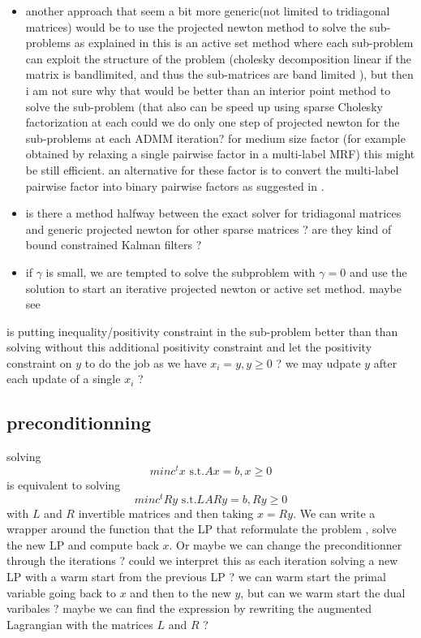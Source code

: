 \documentclass[11pt]{article}
\begin{document}
\begin{itemize}
\item 
another approach that seem a bit more generic(not limited to tridiagonal matrices) would be to use the projected newton method to solve the sub-problems
 as explained in \cite{Tom2013}
 this is an active set method where each sub-problem can exploit the structure of the problem (cholesky decomposition linear if the matrix is bandlimited, and thus the sub-matrices are band limited ), but then i am not  sure why that would be better than an interior point method to solve the sub-problem (that also can be speed up using sparse Cholesky factorization at each  could we do only one step of projected newton for the sub-problems at each ADMM iteration? 
 for medium size factor (for example obtained by relaxing a single pairwise factor in a multi-label MRF) this might be still efficient. an alternative for these factor is to convert the multi-label pairwise factor into binary pairwise factors as suggested in \cite{Smith2011}.
 
 
\item is there a method halfway between the exact solver for tridiagonal matrices and generic  projected newton for other sparse matrices ? are they kind of bound constrained Kalman filters ?  

\item if $\gamma$ is small, we are tempted to solve the subproblem with $\gamma=0$ and use the solution to start an iterative projected newton or active set method.
  maybe see \cite{Gupta2007}
 \end{itemize}
 
 is putting inequality/positivity constraint in the sub-problem  better than than solving without this additional positivity constraint and let the positivity constraint on $y$ to do the job as we have $x_i=y, y\geq 0$ ?  we may udpate $y$ after each update of a single $x_i$ ? 
 
\subsection{preconditionning}
solving
\begin{equation}
min c^t x \text{ s.t.} Ax= b,x \geq 0 
\end{equation}
is equivalent to solving
\begin{equation}
min c^t Ry \text{ s.t.} LARy= b,Ry \geq 0 
\end{equation}
with $L$ and $R$ invertible matrices and then
taking $x=Ry$.
We can write a wrapper around the function that the LP that reformulate the problem , solve the new LP and compute back $x$.
Or maybe we can change the preconditionner through the  iterations ? could we interpret this as each iteration solving a new LP with a warm start from the previous LP ? 
we can warm start the primal variable going back to $x$ and then to the new $y$, but can we warm start the dual varibales ? maybe we can find the expression by
rewriting the augmented Lagrangian with the matrices $L$ and $R$ ? 
\end{document}
